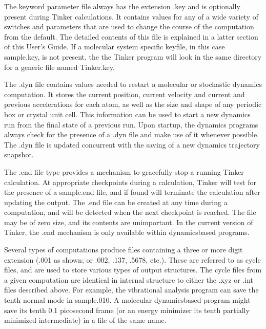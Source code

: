 \documentclass[letterpaper,11pt,english]{sphinxmanual}
\begin{document}

The keyword parameter file always has the extension .key and is optionally present during Tinker calculations. It contains values for any of a wide variety of switches and parameters that are used to change the course of the computation from the default. The detailed contents of this file is explained in a latter section of this User’s Guide. If a molecular system specific keyfile, in this case sample.key, is not present, the the Tinker program will look in the same directory for a generic file named Tinker.key.


The .dyn file contains values needed to restart a molecular or stochastic dynamics computation. It stores the current position, current velocity and current and previous accelerations for each atom, as well as the size and shape of any periodic box or crystal unit cell. This information can be used to start a new dynamics run from the final state of a previous run. Upon startup, the dynamics programs always check for the presence of a .dyn file and make use of it whenever possible. The .dyn file is updated concurrent with the saving of a new dynamics trajectory snapshot.


The .end file type provides a mechanism to gracefully stop a running Tinker calculation. At appropriate checkpoints during a calculation, Tinker will test for the presence of a sample.end file, and if found will terminate the calculation after updating the output. The .end file can be created at any time during a computation, and will be detected when the next checkpoint is reached. The file may be of zero size, and its contents are unimportant. In the current version of Tinker, the .end mechanism is only available within dynamics\sphinxhyphen{}based programs.


Several types of computations produce files containing a three or more digit extension (.001 as shown; or .002, .137, .5678, etc.). These are referred to as cycle files, and are used to store various types of output structures. The cycle files from a given computation are identical in internal structure to either the .xyz or .int files described above. For example, the vibrational analysis program can save the tenth normal mode in sample.010. A molecular dynamics\sphinxhyphen{}based program might save its tenth 0.1 picosecond frame (or an energy minimizer its tenth partially minimized intermediate) in a file of the same name.
\end{document}
